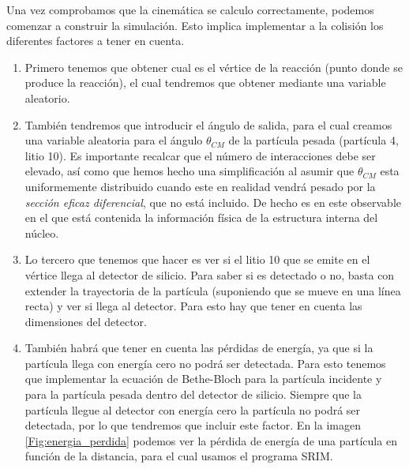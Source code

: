 \documentclass[12pt,a4paper]{article}
\numberwithin{equation}{section}
\numberwithin{figure}{section}
\begin{document}
Una vez comprobamos que la cinemática se calculo correctamente, podemos comenzar a construir la simulación. Esto implica implementar a la colisión los diferentes factores a tener en cuenta. 


\begin{enumerate}

    \item  Primero tenemos que obtener cual es el vértice de la reacción (punto donde se produce la reacción), el cual tendremos que obtener mediante una variable aleatorio. 
    
    \item También tendremos que introducir el ángulo de salida, para el cual creamos una variable aleatoria para el ángulo $\theta_{CM}$ de la partícula pesada (partícula 4, litio 10). Es importante recalcar que el número de interacciones debe ser elevado, así como que hemos hecho una simplificación al asumir que $\theta_{CM}$ esta uniformemente distribuido cuando este en realidad vendrá pesado por la {\it sección eficaz diferencial}, que no está incluido. De hecho es en este observable en el que está contenida la información física de la estructura interna del núcleo. 
    
    \item Lo tercero que tenemos que hacer es ver si el litio 10 que se emite en el vértice llega al detector de silicio. Para saber si es detectado o no, basta con extender la trayectoria de la partícula (suponiendo que se mueve en una línea recta) y ver si llega al detector. Para esto hay que tener en cuenta las dimensiones del detector.     

    \item También habrá que tener en cuenta las pérdidas de energía, ya que si la partícula llega con energía cero no podrá ser detectada. Para esto tenemos que implementar la ecuación de Bethe-Bloch para la partícula incidente y para la partícula pesada dentro del detector de silicio. Siempre que la partícula llegue al detector con energía cero la partícula no podrá ser detectada, por lo que tendremos que incluir este factor. En la imagen \ref{Fig:energia_perdida} podemos ver la pérdida de energía de una partícula en función de la distancia, para el cual usamos el programa SRIM. 
    

\end{enumerate}
\end{document}
